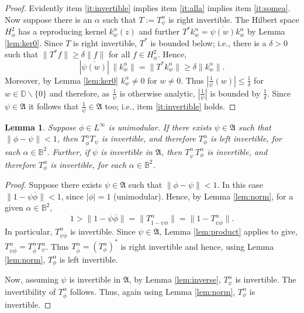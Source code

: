 \documentclass[12pt]{amsart}
\newtheorem{lemma}[theorem]{Lemma}
\theoremstyle{definition}
\theoremstyle{remark}
\numberwithin{equation}{section}
\begin{document}
\begin{proof}
 Evidently item \eqref{it:invertible} implies item \eqref{it:alla} implies item \eqref{it:somea}.
 Now suppose there is an $\alpha$ such that $T:=T^\alpha_\psi$ is right invertible. 
 The Hilbert space $H^2_\alpha$ has a reproducing kernel $k^\alpha_w(z)$ and further  
$T^* k^\alpha_w = \overline{\psi(w)}k^\alpha_w$ by Lemma \ref{lem:ker0}. Since $T$ is right invertible,  $T^*$ 
is bounded below; i.e., there is a $\delta>0$  such that $\|T^*f\|\ge \delta\|f\|$ for all $f\in H^2_\alpha$. Hence,
\[
 |\overline{\psi(w)}| \, \|k^\alpha_w\|
    =\|T^* k^\alpha_w\|\ge \delta \|k^\alpha_w\|.
\]
 Moreover, by Lemma \ref{lem:ker0} $k^\alpha_w\ne 0$ for $w\ne 0.$  Thus $|\frac{1}{\psi}(w)|\le \frac{1}{\delta}$ for
$w\in {\mathbb D}{\smallsetminus} \{0\}$ and therefore, as $\frac{1}{\psi}$ is otherwise analytic,  $|\frac{1}{\psi}|$ is bounded by $\frac{1}{\delta}$. 
Since $\psi\in {\mathfrak{A}}$ it follows that $\frac{1}{\psi}\in {\mathfrak{A}}$ too; i.e., item \eqref{it:invertible} holds.
\end{proof}

\begin{lemma}
\label{lem:leftinvertible}
 Suppose $\phi\in L^\infty$ is unimodular. If there exists $\psi\in {\mathfrak{A}}$ such that $\|\phi-\psi\|<1$, then $T^\alpha_{\overline{\phi}}T_\psi$  is invertible,
and therefore $T^\alpha_\phi$ is left invertible, for each $\alpha\in {\mathbb{B}^2}$.
 Further, if $\psi$ is invertible in ${\mathfrak{A}}$, then $T^\alpha_{\overline{\psi}}\,T^\alpha_\phi$ is invertible, and therefore $T^\alpha_{\phi}$ is invertible, for each $\alpha\in {\mathbb{B}^2}$.
\end{lemma}

\begin{proof}
Suppose there exists $\psi\in {\mathfrak{A}}$ such that $\|\phi-\psi\|<1$. In this case $\|1-\psi \overline{\phi}\|<1$, since $|\phi|=1$ (unimodular).
Hence, by Lemma \ref{lem:norm}, for a given $\alpha\in {\mathbb{B}^2}$,
\[
 1 > \|1-\psi \overline{\phi}\| = \|T^\alpha_{1-\psi\overline{\phi}}\|=\|1-T^\alpha_{\psi \overline{\phi}}\|.
\]
In particular, $T^\alpha_{\psi \overline{\phi}}$ is invertible.
Since $\psi\in {\mathfrak{A}}$, Lemma \ref{lem:product} applies to give, $T^\alpha_{\psi\overline{\phi}}=T^\alpha_{\overline{\phi}}T^\alpha_\psi$. Thus $T^\alpha_{\overline{\phi}} = (T^\alpha_\phi)^*$ is right invertible and hence, using Lemma \ref{lem:norm}, $T^\alpha_\phi$ is left invertible. 

 Now, assuming $\psi$ is invertible in ${\mathfrak{A}}$, 
by Lemma \ref{lem:inverse}, $T^\alpha_\psi$ is invertible.  The invertibility of  $T^\alpha_{\overline{\phi}}$ follows.
Thus, again using Lemma \ref{lem:norm}, $T^\alpha_\phi$ is invertible.
\end{proof}
\end{document}
